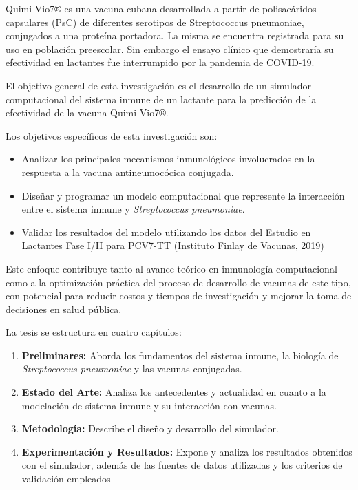 Quimi-Vio7® es una vacuna cubana desarrollada a partir de polisacáridos capsulares (PsC) de diferentes serotipos de Streptococcus pneumoniae, conjugados a una proteína portadora. 
La misma se encuentra registrada para su uso en población preescolar. Sin embargo el ensayo clínico que demostraría su efectividad en lactantes fue interrumpido por la pandemia de COVID-19.


\vspace{0.5cm}

El objetivo general de esta investigación es el desarrollo de un simulador computacional del sistema inmune de un lactante para la predicción de la efectividad de la vacuna Quimi-Vio7®.

Los objetivos específicos de esta investigación son:
\begin{itemize}
    \item Analizar los principales mecanismos inmunológicos involucrados en la respuesta a la vacuna antineumocócica conjugada.
    \item Diseñar y programar un modelo computacional que represente la interacción entre el sistema inmune y \textit{Streptococcus pneumoniae}.
    
    \item Validar los resultados del modelo utilizando los datos del Estudio en Lactantes Fase I/II para PCV7-TT (Instituto Finlay de Vacunas, 2019)
\end{itemize}

Este enfoque contribuye tanto al avance teórico en inmunología computacional como a la optimización práctica del proceso de desarrollo de vacunas de este tipo, con potencial para reducir costos y tiempos de investigación y mejorar la toma de decisiones en salud pública.



\vspace{0.5cm}

La tesis se estructura en cuatro capítulos:
\begin{enumerate}
    \item \textbf{Preliminares:} Aborda los fundamentos del sistema inmune, la biología de \textit{Streptococcus pneumoniae} y  las vacunas conjugadas.
    \item \textbf{Estado del Arte:} Analiza los antecedentes y actualidad en cuanto a la modelación de sistema inmune y su interacción con vacunas.
    
    \item \textbf{Metodología:} Describe el diseño y desarrollo del simulador.
    \item \textbf{Experimentación y Resultados:} Expone y analiza los resultados obtenidos con el simulador, además de las fuentes de datos utilizadas y los criterios de validación empleados
\end{enumerate}